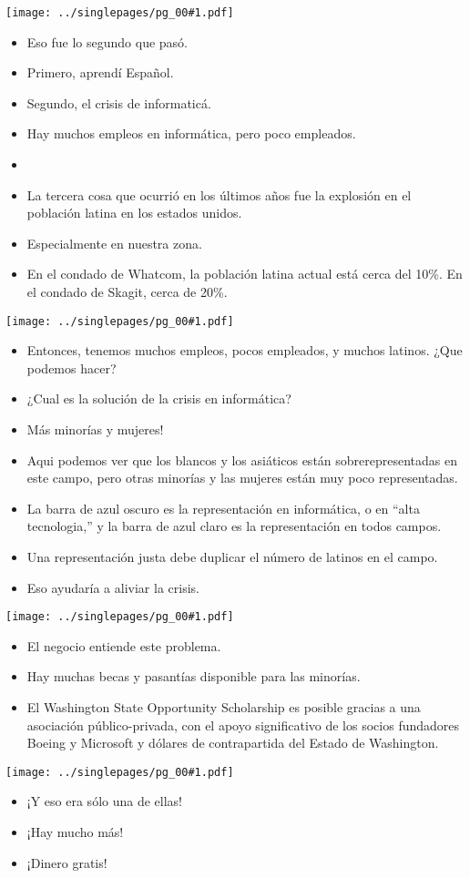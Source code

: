 \documentclass[12pt]{article}
\newcommand{\bi}{\begin{itemize}}
\newcommand{\ei}{\end{itemize}}
\newcommand{\cue}{\mbox{}
  \fbox{\sf Next slide}
}
\newcommand{\fig}[1]{
  \newpage  
  \begin{center}
    \texttt{[image: ../singlepages/pg\_00\#1.pdf]}
  \end{center}
  
}
\begin{document}
\fig{14}
\bi
\item
Eso fue lo segundo que pasó.
\item
Primero, aprendí Español.
\item
Segundo, el crisis de informaticá.
\item
Hay muchos empleos en informática, pero poco empleados.
\item \cue
\item
  La tercera cosa que ocurrió en los últimos años fue la explosión en el
  población latina en los estados unidos.
\item
 Especialmente en nuestra
 zona.
\item
  En el condado de Whatcom, la población latina actual está cerca
del 10\%.  En el condado de Skagit, cerca de 20\%. 
\ei

\fig{16}

\bi
\item
Entonces, tenemos muchos empleos, pocos empleados, y muchos latinos.
¿Que podemos hacer?
\item
¿Cual es la solución de la crisis en informática?
\item \cue
Más minorías y mujeres!
\item
Aqui podemos ver que los blancos y los asiáticos están
sobrerepresentadas en este campo, pero otras minorías y las mujeres
están muy poco representadas.
\item
  La barra de azul oscuro es la
representación en informática, o en ``alta tecnologia,'' y la barra de
azul claro es la representación en todos campos.
\item
Una representación justa debe duplicar el número de latinos en el
campo.
\item
Eso ayudaría a aliviar la crisis.
\ei

\fig{17}

\bi
\item El negocio entiende este problema.
\item
  Hay muchas becas y pasantías disponible
  para las minorías.
\item
  El Washington State Opportunity Scholarship es
posible gracias a una asociación público-privada, con el apoyo
significativo de los socios fundadores Boeing y Microsoft y dólares de
contrapartida del Estado de Washington.
\ei


\fig{18}

\bi
\item
  ¡Y eso era sólo una de ellas!
\item
  ¡Hay mucho más!
\item
  ¡Dinero gratis!
  \ei
  
\end{document}
